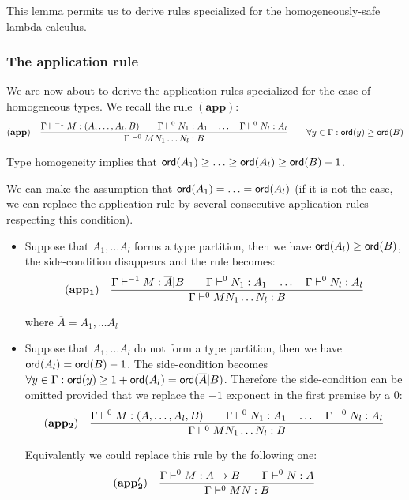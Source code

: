 This lemma permits us to derive rules specialized for the
homogeneously-safe lambda calculus.

\subsubsection{The application rule} We are now about to derive the
application rules specialized for the case of homogeneous types. We
recall the rule $\mathbf{(app)}$:
$$ \mathbf{(app)} \quad  \frac{\displaystyle \Gamma \vdash^{-1} M : (A,\ldots,A_l,B)
                                        \qquad \Gamma \vdash^{0} N_1 : A_1
                                        \quad \ldots \quad \Gamma \vdash^{0} N_l : A_l  }{\Gamma  \vdash^0 M N_1 \ldots N_l : B}
                                    \qquad
                                   \forall y \in \Gamma : {\sf ord}(y) \geq {\sf ord}(B)$$

Type homogeneity implies that ${\sf ord}(A_1) \geq \ldots \geq {\sf ord}(A_l)
\geq {\sf ord}(B) - 1$.

We can make the assumption that ${\sf ord}(A_1) = \ldots = {\sf ord}(A_l)$ (if it is not the case,
we can replace the application rule by several consecutive application rules
respecting this condition).


\begin{itemize}
\item Suppose that $A_1, \ldots A_l$ forms a type partition, then we
have ${\sf ord}(A_l) \geq {\sf ord}(B)$, the side-condition disappears and
the rule becomes:
$$ \mathbf{(app_1)} \quad  \frac{\displaystyle \Gamma \vdash^{-1} M : \overline{A} | B
                                        \qquad \Gamma \vdash^{0} N_1 :
                                        A_1
                                        \quad \ldots \quad \Gamma \vdash^{0} N_l :
                                        A_l
                                        }{\Gamma  \vdash^{0} M N_1 \ldots N_l : B}
$$

where $\overline{A} = A_1, \ldots A_l$

\item  Suppose that $A_1, \ldots A_l$ do not form a type partition, then we
have ${\sf ord}(A_l) = {\sf ord}(B) - 1$. The side-condition becomes
$\forall y \in \Gamma : {\sf ord}(y) \geq 1 +{\sf ord}(A_l) = {\sf ord}(\overline{A}|B)$. Therefore the side-condition
can be omitted provided that we replace the $-1$ exponent in the first premise by a $0$:
$$ \mathbf{(app_2)} \quad  \frac{\displaystyle \Gamma \vdash^0 M : (A,\ldots,A_l,B)
                                        \qquad \Gamma \vdash^{0} N_1 : A_1
                                        \quad \ldots
                                        \quad \Gamma \vdash^{0} N_l : A_l
                                   }{\Gamma  \vdash^0 M N_1 \ldots N_l : B}
$$

Equivalently we could replace this rule by the following one:
$$ \mathbf{(app_2')} \quad  \frac{\displaystyle \Gamma \vdash^0 M : A\rightarrow B
                                        \qquad \Gamma \vdash^{0} N : A }{\Gamma  \vdash^{0} M N : B}$$
\end{itemize}

